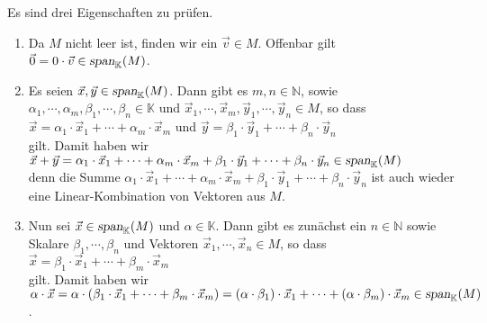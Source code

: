 \proof
Es sind drei Eigenschaften zu pr\"{u}fen.
\begin{enumerate}
\item Da $M$ nicht leer ist, finden wir ein $\vec{v} \in M$.  Offenbar gilt
      \\[0.2cm]
      \hspace*{1.3cm}
      $\vec{0} = 0 \cdot \vec{v} \in \textsl{span}_\mathbb{K}(M)$.      
\item Es seien $\vec{x}, \vec{y} \in \textsl{span}_\mathbb{K}(M)$.  Dann gibt es $m,n \in \mathbb{N}$,
      sowie $\alpha_1, \cdots, \alpha_m, \beta_1, \cdots, \beta_n \in \mathbb{K}$ und
      $\vec{x}_1, \cdots, \vec{x}_m, \vec{y}_1, \cdots, \vec{y}_n \in M$, so dass 
      \\[0.2cm]
      \hspace*{1.3cm}
      $\vec{x} = \alpha_1 \cdot \vec{x}_1 + \cdots + \alpha_m \cdot \vec{x}_m$ \quad und \quad
      $\vec{y} = \beta_1 \cdot \vec{y}_1 + \cdots + \beta_n \cdot \vec{y}_n$ 
      \\[0.2cm]
      gilt. Damit haben wir
      \\[0.2cm]
      \hspace*{1.3cm}
      $
       \vec{x} + \vec{y} =  
          \alpha_1 \cdot \vec{x}_1 + \cdots + \alpha_m \cdot \vec{x}_m +
          \beta_1 \cdot \vec{y}_1 + \cdots + \beta_n \cdot \vec{y}_n \in \textsl{span}_\mathbb{K}(M)
      $
      \\[0.2cm]
      denn die Summe 
      $\alpha_1 \cdot \vec{x}_1 + \cdots + \alpha_m \cdot \vec{x}_m + \beta_1 \cdot \vec{y}_1 + \cdots + \beta_n \cdot \vec{y}_n$
      ist auch wieder eine Linear-Kombination von Vektoren aus $M$.
\item Nun sei $\vec{x} \in \textsl{span}_\mathbb{K}(M)$ und $\alpha \in \mathbb{K}$.
      Dann gibt es zun\"{a}chst ein $n \in \mathbb{N}$ sowie Skalare $\beta_1, \cdots, \beta_n$
      und Vektoren $\vec{x}_1, \cdots, \vec{x}_n \in M$, so dass
      \\[0.2cm]
      \hspace*{1.3cm}
      $\vec{x} = \beta_1 \cdot \vec{x}_1 + \cdots + \beta_m \cdot \vec{x}_m$
      \\[0.2cm]
      gilt.  Damit haben wir
      \\[0.2cm]
      \hspace*{1.3cm}
      $\alpha \cdot \vec{x} = \alpha \cdot (\beta_1 \cdot \vec{x}_1 + \cdots + \beta_m \cdot \vec{x}_m) =
       (\alpha \cdot \beta_1) \cdot \vec{x}_1 + \cdots + (\alpha \cdot \beta_m) \cdot \vec{x}_m \in
       \textsl{span}_\mathbb{K}(M)$.
      \qeds
\end{enumerate}


